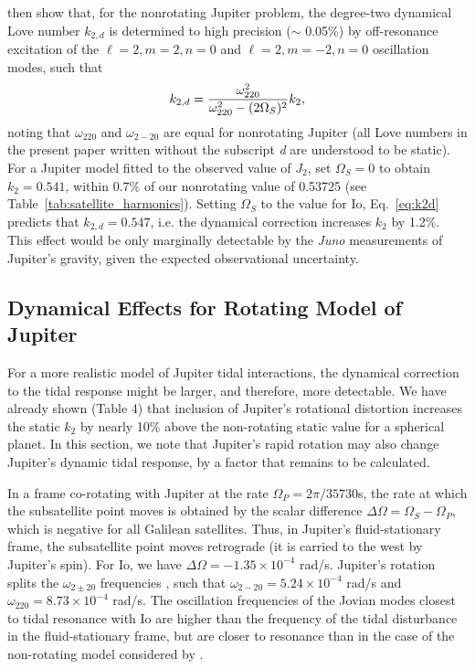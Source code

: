 \citet{vorontsov1984} then show that, for the nonrotating Jupiter problem, the
degree-two dynamical Love number $k_{2,d}$ is determined to high precision ($\sim$
0.05\%) by off-resonance excitation of the $\ell=2, m=2, n=0$ and $\ell=2, m=-2, n=0$
oscillation modes, such that
%
\begin{equation}
    k_{2,d}={{\omega^2_{220}} \over {\omega^2_{220} - (2 \Omega_S)^2}} k_2,
\label{eq:k2d}
\end{equation}
%
noting that $\omega_{220}$ and $\omega_{2-20}$ are equal for nonrotating Jupiter (all
Love numbers in the present paper written without the subscript {\it d} are
understood to be static).  For a Jupiter model fitted to the observed value of $J_2$,
\citet{vorontsov1984} set $\Omega_S = 0$ to obtain $k_2  = 0.541$, within 0.7\% of
our nonrotating value of 0.53725 (see Table~\ref{tab:satellite_harmonics}).  Setting
$\Omega_S$ to the value for Io, Eq.~\ref{eq:k2d} predicts that $k_{2,d} = 0.547$,
i.e. the dynamical correction increases $k_2$ by 1.2\%.  This effect would be only
marginally detectable by the \textit{Juno} measurements of Jupiter's gravity, given
the expected observational uncertainty.

\subsection{{\bf Dynamical Effects} for Rotating Model of Jupiter}

For a more realistic model of Jupiter tidal interactions, the dynamical correction to
the tidal response might be larger, and therefore, more detectable.  We have already
shown (Table 4) that inclusion of Jupiter's rotational distortion increases the
static $k_2$ by nearly 10\% above the non-rotating static value for a spherical
planet.  In this section, we note that
Jupiter's rapid rotation may also change Jupiter's dynamic tidal response,
by a factor that remains to be calculated.

In a frame co-rotating with Jupiter at the rate $\Omega_P=2 \pi / 35730$s,
the rate at which the subsatellite point moves is obtained by the scalar difference
$\Delta \Omega = \Omega_S - \Omega_P$, which is negative for all Galilean satellites.  Thus,
in Jupiter's fluid-stationary frame, the subsatellite point moves retrograde
(it is carried to the west by Jupiter's spin).  
For Io, we have $\Delta \Omega = -1.35 \times 10^{-4}$ rad/s.
Jupiter's rotation splits the
$\omega_{2\pm20}$ frequencies \citep{vorontsov1981}, such that
$\omega_{2-20}= 5.24 \times 10^{-4}$ rad/s and
$\omega_{220}= 8.73 \times 10^{-4}$ rad/s.  The oscillation
frequencies of the Jovian modes closest to tidal resonance with Io are
higher than the frequency of the tidal disturbance in
the fluid-stationary frame, but are closer to resonance than
in the case of the non-rotating model considered by
\citet{vorontsov1984}.

